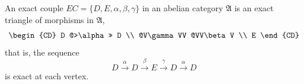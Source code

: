 An exact couple $\mathit{EC} = \{D, E, \alpha, \beta, \gamma\}$ in an abelian category $\mathfrak{A}$ is an exact triangle of morphisms in $\mathfrak{A}$,
$$\begin{CD}
D @>\alpha>> D \\
@V\gamma VV @VV\beta V \\
E
\end{CD}$$
that is, the sequence
$$D \xrightarrow{\alpha} D \xrightarrow{\beta} E \xrightarrow{\gamma} D \xrightarrow{\alpha} D$$
is exact at each vertex.
